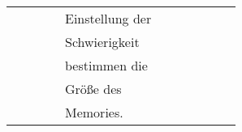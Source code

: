 \begin{longtable}{|c|l|l|c|l|l|c|c|l|l|l|}
            &       &            &    & Einstellung der &   &   & & & &\\
            &       &            &    & Schwierigkeit &   &   & & & &\\
            &       &            &    & bestimmen die &   &   & & & &\\
            &       &            &    & Größe des &   &   & & & &\\
            &       &            &    & Memories. &   &   & & & &\\
            \hline
            
    \end{longtable}  
    

